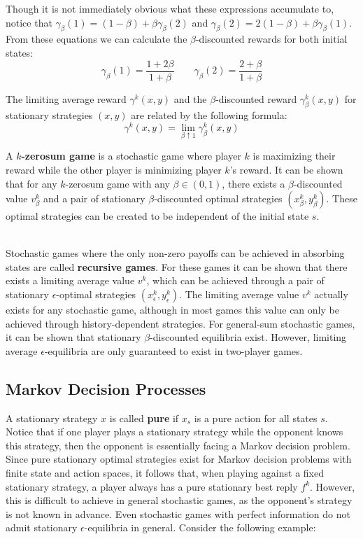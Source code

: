 \documentclass[12pt]{article}
\begin{document}
\noindent
Though it is not immediately obvious what these expressions accumulate to, notice that $\gamma_\beta(1) = (1 - \beta) + \beta\gamma_\beta(2)$ and $\gamma_\beta(2) = 2(1 - \beta) + \beta\gamma_\beta(1)$.
From these equations we can calculate the $\beta$-discounted rewards for both initial states:
\[ \gamma_\beta(1) = \frac{1 + 2\beta}{1 + \beta} \quad \quad \gamma_\beta(2) = \frac{2 + \beta}{1 + \beta} \]

\noindent
The limiting average reward $\gamma^k(x, y)$ and the $\beta$-discounted reward $\gamma^k_\beta(x, y)$ for stationary strategies $(x, y)$ are related by the following formula:
\[ \gamma^k(x, y) = \lim_{\beta \uparrow 1} \gamma^k_\beta(x, y) \]

\newpage
\noindent
A \textbf{$k$-zerosum game} is a stochastic game where player $k$ is maximizing their reward while the other player is minimizing player $k$'s reward.
It can be shown that for any $k$-zerosum game with any $\beta \in (0, 1)$, there exists a $\beta$-discounted value $v_\beta^k$ and a pair of stationary $\beta$-discounted optimal strategies $(x_\beta^k, y_\beta^k)$.
These optimal strategies can be created to be independent of the initial state $s$.

\noindent
\\
Stochastic games where the only non-zero payoffs can be achieved in absorbing states are called \textbf{recursive games}.
For these games it can be shown that there exists a limiting average value $v^k$, which can be achieved through a pair of stationary $\epsilon$-optimal strategies $(x_\epsilon^k, y_\epsilon^k)$.
The limiting average value $v^k$ actually exists for any stochastic game, although in most games this value can only be achieved through history-dependent strategies.
For general-sum stochastic games, it can be shown that stationary $\beta$-discounted equilibria exist.
However, limiting average $\epsilon$-equilibria are only guaranteed to exist in two-player games.

\subsection{Markov Decision Processes}
A stationary strategy $x$ is called \textbf{pure} if $x_s$ is a pure action for all states $s$.
Notice that if one player plays a stationary strategy while the opponent knows this strategy, then the opponent is essentially facing a Markov decision problem.
Since pure stationary optimal strategies exist for Markov decision problems with finite state and action spaces, it follows that, when playing against a fixed stationary strategy, a player always has a pure stationary best reply $f^k$.
However, this is difficult to achieve in general stochastic games, as the opponent's strategy is not known in advance.
Even stochastic games with perfect information do not admit stationary $\epsilon$-equilibria in general.
Consider the following example:
\end{document}
